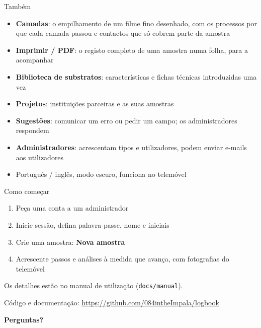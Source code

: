 \documentclass[aspectratio=169,11pt]{beamer}
\newcommand{\ui}[1]{\textsf{\textbf{#1}}}
\begin{document}
\begin{frame}{Também}
  \begin{itemize}
    \item \textbf{Camadas}: o empilhamento de um filme fino desenhado, com os processos por que cada camada passou e contactos que só cobrem parte da amostra
    \item \textbf{Imprimir / PDF}: o registo completo de uma amostra numa folha, para a acompanhar
    \item \textbf{Biblioteca de substratos}: características e fichas técnicas introduzidas uma vez
    \item \textbf{Projetos}: instituições parceiras e as suas amostras
    \item \textbf{Sugestões}: comunicar um erro ou pedir um campo; os administradores respondem
    \item \textbf{Administradores}: acrescentam tipos e utilizadores, podem enviar e-mails aos utilizadores
    \item Português / inglês, modo escuro, funciona no telemóvel
  \end{itemize}
\end{frame}

\begin{frame}{Como começar}
  \begin{enumerate}
    \item Peça uma conta a um administrador
    \item Inicie sessão, defina palavra-passe, nome e \alert{iniciais}
    \item Crie uma amostra: \ui{Nova amostra}
    \item Acrescente passos e análises à medida que avança, com fotografias do telemóvel
  \end{enumerate}

  \vspace{0.5cm}
  Os detalhes estão no manual de utilização (\texttt{docs/manual}).

  \vspace{0.2cm}
  Código e documentação: \url{https://github.com/084intheImpala/logbook}
\end{frame}

{
\begin{frame}[plain]
  \centering\vfill\color{white}\Huge\textbf{Perguntas?}\vfill
\end{frame}
}
\end{document}
